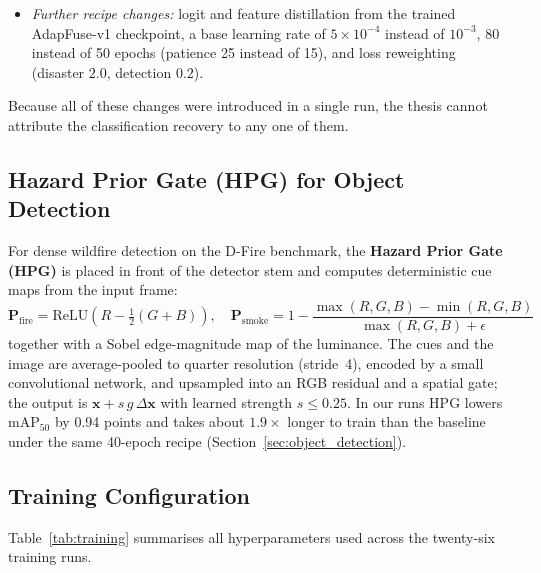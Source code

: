 \begin{enumerate}
\begin{itemize}
        \item \textit{Further recipe changes:} logit and feature distillation from the trained AdapFuse-v1 checkpoint, a base learning rate of $5\times10^{-4}$ instead of $10^{-3}$, 80 instead of 50 epochs (patience 25 instead of 15), and loss reweighting (disaster $2.0$, detection $0.2$).
    \end{itemize}
    Because all of these changes were introduced in a single run, the thesis cannot attribute the classification recovery to any one of them.
\end{enumerate}

\subsection{Hazard Prior Gate (HPG) for Object Detection}
\label{sec:hpg}

For dense wildfire detection on the D-Fire benchmark, the \textbf{Hazard Prior Gate (HPG)} is placed in front of the detector stem and computes deterministic cue maps from the input frame:
\begin{equation}
    \mathbf{P}_{\text{fire}} = \text{ReLU}\!\left(R - \tfrac{1}{2}(G + B)\right), \quad \mathbf{P}_{\text{smoke}} = 1 - \frac{\max(R,G,B) - \min(R,G,B)}{\max(R,G,B) + \epsilon}
\end{equation}
together with a Sobel edge-magnitude map of the luminance. The cues and the image are average-pooled to quarter resolution (stride~4), encoded by a small convolutional network, and upsampled into an RGB residual and a spatial gate; the output is $\mathbf{x} + s\,g\,\Delta\mathbf{x}$ with learned strength $s \leq 0.25$. In our runs HPG lowers $\mathrm{mAP}_{50}$ by 0.94 points and takes about $1.9\times$ longer to train than the baseline under the same 40-epoch recipe (Section~\ref{sec:object_detection}).

\subsection{Training Configuration}

Table~\ref{tab:training} summarises all hyperparameters used across the twenty-six training runs.

